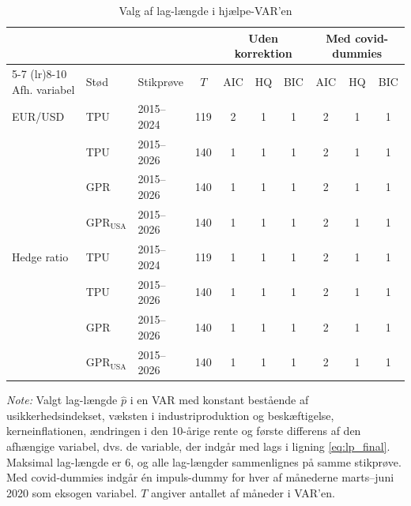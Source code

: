 \begin{table}[H]
\centering
\caption{Valg af lag-længde i hjælpe-VAR'en}
\label{tab:lagvalg}
\begin{threeparttable}
\begin{tabular}{lll c ccc ccc}
\toprule
 & & & & \multicolumn{3}{c}{Uden korrektion} & \multicolumn{3}{c}{Med covid-dummies} \\
\cmidrule(lr){5-7} \cmidrule(lr){8-10}
Afh. variabel & Stød & Stikprøve & $T$ & AIC & HQ & BIC & AIC & HQ & BIC \\
\midrule
EUR/USD & TPU & 2015--2024 & 119 & 2 & 1 & 1 & 2 & 1 & 1 \\
 & TPU & 2015--2026 & 140 & 1 & 1 & 1 & 2 & 1 & 1 \\
 & GPR & 2015--2026 & 140 & 1 & 1 & 1 & 2 & 1 & 1 \\
 & $\text{GPR}_{\text{USA}}$ & 2015--2026 & 140 & 1 & 1 & 1 & 2 & 1 & 1 \\
\addlinespace
Hedge ratio & TPU & 2015--2024 & 119 & 1 & 1 & 1 & 2 & 1 & 1 \\
 & TPU & 2015--2026 & 140 & 1 & 1 & 1 & 2 & 1 & 1 \\
 & GPR & 2015--2026 & 140 & 1 & 1 & 1 & 2 & 1 & 1 \\
 & $\text{GPR}_{\text{USA}}$ & 2015--2026 & 140 & 1 & 1 & 1 & 2 & 1 & 1 \\
\bottomrule
\end{tabular}
\begin{tablenotes}[flushleft]\footnotesize
\item \textit{Note:} Valgt lag-længde $\hat p$ i en VAR med konstant bestående af
usikkerhedsindekset, væksten i industriproduktion og beskæftigelse, kerneinflationen,
ændringen i den 10-årige rente og første differens af den afhængige variabel, dvs. de
variable, der indgår med lags i ligning \eqref{eq:lp_final}. Maksimal lag-længde er 6, og
alle lag-længder sammenlignes på samme stikprøve. Med covid-dummies indgår én impuls-dummy
for hver af månederne marts--juni 2020 som eksogen variabel. $T$ angiver antallet af
måneder i VAR'en.
\end{tablenotes}
\end{threeparttable}
\end{table}
